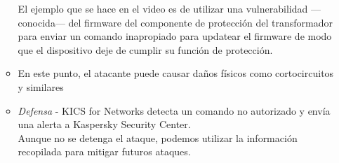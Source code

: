 \begin{enumerate}
\begin{itemize}
      El ejemplo que se hace en el video es de utilizar una vulnerabilidad ---conocida--- del firmware del componente de protección del transformador para enviar un comando inapropiado para updatear el firmware de modo que el dispositivo deje de cumplir su función de protección.
      \item En este punto, el atacante puede causar daños físicos como cortocircuitos y similares
      \item \textit{Defensa} - KICS for Networks detecta un comando no autorizado y envía una alerta a Kaspersky Security Center.\\
      Aunque no se detenga el ataque, podemos utilizar la información recopilada para mitigar futuros ataques.
   \end{itemize}
\end{enumerate}

